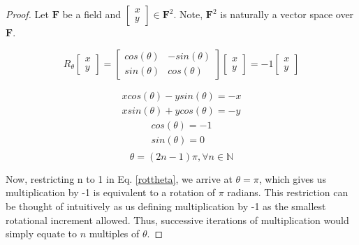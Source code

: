 \documentclass{article}
\begin{document}
\begin{proof}
  Let $\mathbf{F}$ be a field and $\begin{bmatrix}
    x \\
    y
  \end{bmatrix}
  \in
  \mathbf{F}^2$.
  Note, $\mathbf{F}^2$ is naturally a vector space over $\mathbf{F}$.

  \begin{equation}
    R_\theta
    \begin{bmatrix}
      x \\
      y
    \end{bmatrix}
    =
    \begin{bmatrix}
      cos(\theta) & -sin(\theta) \\
      sin(\theta) & cos(\theta)
    \end{bmatrix}
    \begin{bmatrix}
      x \\
      y
    \end{bmatrix}
    =
    -1
    \begin{bmatrix}
      x \\
      y
    \end{bmatrix}
  \end{equation}

  \begin{equation}
    \begin{matrix}
      x cos(\theta) - y sin(\theta) = -x\\
      x sin(\theta) + y cos(\theta) = -y
    \end{matrix}
  \end{equation}
  \begin{equation}
    \begin{matrix}
      cos(\theta) = -1 \\
      sin(\theta) = 0 \\
    \end{matrix}
  \end{equation}
  \begin{equation}\label{rottheta}
    \theta = (2n-1)\pi, \forall n \in \mathbb{N}
  \end{equation}

  Now, restricting n to 1 in Eq. \ref{rottheta}, we arrive at $\theta = \pi$, which
  gives us multiplication by -1 is equivalent to a rotation of $\pi$ radians.
  This restriction can be thought of intuitively as us defining multiplication by
  -1 as the smallest rotational increment allowed. Thus, successive iterations of
  multiplication would simply equate to $n$ multiples of $\theta$.
\end{proof}
\end{document}
